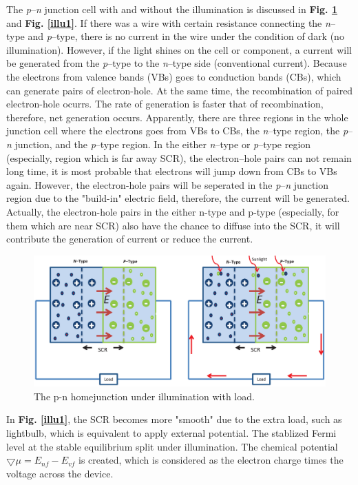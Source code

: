 \documentclass[a4paper, 12pt, titlepage,oneside,drop]{kthesis}
\begin{document}
The \textit{p}--\textit{n} junction cell with and without the illumination is discussed in \textbf{Fig. \ref{illu}} and \textbf{Fig. \ref{illu1}}. If there was a wire with certain resistance connecting 
the \textit{n}--type and \textit{p}--type, there is no current in the wire under the condition of dark (no illumination). However, if the light shines on the cell or component, a current will be generated from the \textit{p}--type
to the \textit{n}--type side (conventional current). Because the electrons from valence bands (VBs) goes to conduction bands (CBs), which can generate pairs of electron-hole. At the same time, the recombination of paired electron-hole ocurrs. The rate of generation 
is faster that of recombination, therefore, net generation occurs. Apparently, there are three regions in the whole junction cell where the electrons goes from VBs to CBs, the \textit{n}--type region, the \textit{p}--\textit{n}
junction, and the \textit{p}--type region. In the either \textit{n}--type or \textit{p}--type region (especially, region which is far away SCR), the electron–hole pairs can not remain long time,  it is most probable that electrons
will jump down from CBs to VBs again. However, the electron-hole pairs will be seperated in the \textit{p}--\textit{n} junction region due to the "build-in" electric field, therefore, the current will be generated. Actually, the electron-hole pairs in the either n-type and p-type 
(especially, for them which are near SCR) also have the chance to diffuse into the SCR, it will contribute the generation of current or reduce the current.

\begin{figure}[H]
\centering
\includegraphics[scale=0.5]{illumination.eps}
\caption{The p-n homejunction under illumination with load.}
\label{illu}
\end{figure}

In \textbf{Fig. \ref{illu1}}, the SCR becomes more "smooth" due to the extra load, such as lightbulb, which is equivalent to apply external potential. The stablized Fermi level at the stable equilibrium split under illumination.
The chemical potential $\bigtriangledown \mu = E_{nf} - E_{vf}$ is created, which is considered as the electron charge times the voltage across the device. 
\end{document}
